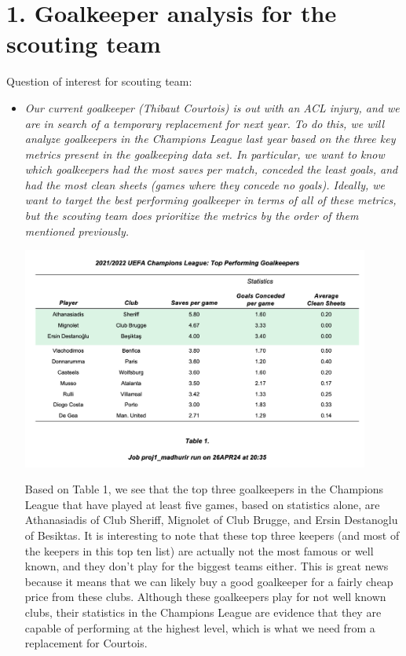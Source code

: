 \documentclass[11pt]{report}
\begin{document}
\section*{1. Goalkeeper analysis for the scouting team} 

Question of interest for scouting team:
	\begin{itemize}
		\item \textit{Our current goalkeeper (Thibaut Courtois) is out with an ACL injury, and we are in search of a temporary replacement for next year. To do this, we will analyze goalkeepers in the Champions League last year based on the three key metrics present in the goalkeeping data set. In particular, we want to know which goalkeepers had the most saves per match, conceded the least goals, and had the most clean sheets (games where they concede no goals). Ideally, we want to target the best performing goalkeeper in terms of all of these metrics, but the scouting team does prioritize the metrics by the order of them mentioned previously.}
			\begin{center}
				\includegraphics[width=0.9\textwidth]{images_for_report/table1}
			\end{center} 
			
			Based on Table 1, we see that the top three goalkeepers in the Champions League that have played at least five games, based on statistics alone, are Athanasiadis of Club Sheriff, Mignolet of Club Brugge, and Ersin Destanoglu of Besiktas. It is interesting to note that these top three keepers (and most of the keepers in this top ten list) are actually not the most famous or well known, and they don't play for the biggest teams either. This is great news because it means that we can likely buy a good goalkeeper for a fairly cheap price from these clubs. Although these goalkeepers play for not well known clubs, their statistics in the Champions League are evidence that they are capable of performing at the highest level, which is what we need from a replacement for Courtois.  
	\end{itemize}
	
\end{document}
